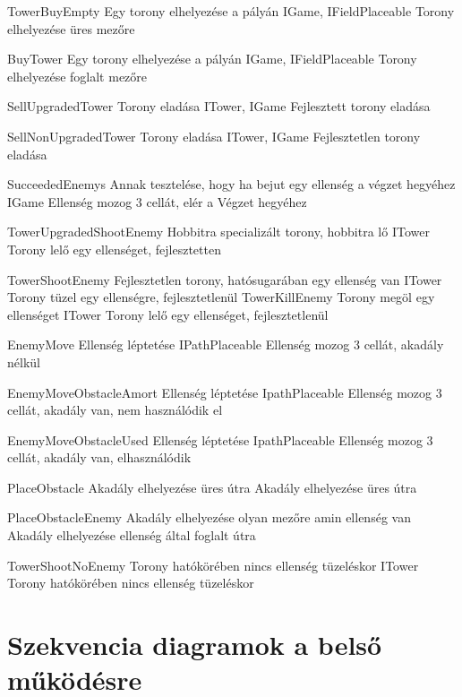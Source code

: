 \usecaseteszteset
{TowerBuyEmpty}
{Egy torony elhelyezése a pályán}
{IGame, IFieldPlaceable}
{Torony elhelyezése üres mezőre}

\usecaseteszteset
{BuyTower}
{Egy torony elhelyezése a pályán}
{IGame, IFieldPlaceable}
{Torony elhelyezése foglalt mezőre}

\usecaseteszteset
{SellUpgradedTower}
{Torony eladása}
{ITower, IGame}
{Fejlesztett torony eladása}

\usecaseteszteset
{SellNonUpgradedTower}
{Torony eladása}
{ITower, IGame}
{Fejlesztetlen torony eladása}

\usecaseteszteset
{SucceededEnemys}
{Annak tesztelése, hogy ha bejut egy ellenség a végzet hegyéhez}
{IGame}
{Ellenség mozog 3 cellát, elér a Végzet hegyéhez}

\usecaseteszteset
{TowerUpgradedShootEnemy}
{Hobbitra specializált torony, hobbitra lő}
{ITower}
{Torony lelő egy ellenséget, fejlesztetten}

\usecaseteszteset
{TowerShootEnemy}
{Fejlesztetlen torony, hatósugarában egy ellenség van}
{ITower}
{Torony tüzel egy ellenségre, fejlesztetlenül}
\usecaseteszteset
{TowerKillEnemy}
{Torony megöl egy ellenséget}
{ITower}
{Torony lelő egy ellenséget, fejlesztetlenül}

\usecaseteszteset
{EnemyMove}
{Ellenség léptetése}
{IPathPlaceable}
{Ellenség mozog 3 cellát, akadály nélkül}

\usecaseteszteset
{EnemyMoveObstacleAmort}
{Ellenség léptetése}
{IpathPlaceable}
{Ellenség mozog 3 cellát, akadály van, nem használódik el}

\usecaseteszteset
{EnemyMoveObstacleUsed}
{Ellenség léptetése}
{IpathPlaceable}
{Ellenség mozog 3 cellát, akadály van, elhasználódik}

\usecaseteszteset
{PlaceObstacle}
{Akadály elhelyezése üres útra}
{}
{Akadály elhelyezése üres útra}

\usecaseteszteset
{PlaceObstacleEnemy}
{Akadály elhelyezése olyan mezőre amin ellenség van}
{}
{Akadály elhelyezése ellenség által foglalt útra}

\usecaseteszteset
{TowerShootNoEnemy}
{Torony hatókörében nincs ellenség tüzeléskor}
{ITower}
{Torony hatókörében nincs ellenség tüzeléskor}


\section{Szekvencia diagramok a belső működésre}

